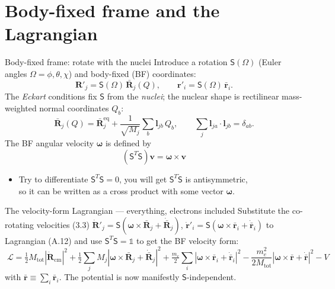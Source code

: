 \documentclass[aspectratio=169,10pt]{beamer}
\newcommand{\stagenum}{0}
\newcommand{\setstage}[1]{\renewcommand{\stagenum}{#1}}
\begin{document}
\setstage{2}
\section{Body-fixed frame and the Lagrangian}

\begin{frame}{Body-fixed frame: rotate with the nuclei}
\setstage{2}
Introduce a rotation $\mathsf S(\Omega)$ (Euler angles $\Omega=\phi,\theta,\chi$) and body-fixed (BF) coordinates:
\begin{equation*}
\mathbf{R}'_j=\mathsf{S}(\Omega)\,\bar{\mathbf{R}}_j(Q),\qquad \mathbf{r}'_i=\mathsf{S}(\Omega)\,\bar{\mathbf{r}}_i. \tag{3.1}
\end{equation*}
The \emph{Eckart} conditions fix $\mathsf S$ from the \emph{nuclei}; the nuclear shape is rectilinear mass-weighted \alert{normal coordinates} $Q_b$:
\begin{equation*}
\bar{\mathbf{R}}_j(Q)=\bar{\mathbf{R}}_j^{\mathrm{eq}}+\frac{1}{\sqrt{M_j}}\sum_b\mathbf{l}_{jb}\,Q_b ,
\qquad \sum_j\mathbf{l}_{ja}\!\cdot\!\mathbf{l}_{jb}=\delta_{ab}. \tag{3.1a}
\end{equation*}
The BF angular velocity $\boldsymbol{\omega}$ is defined by
\begin{equation*}
(\mathsf{S}^{T}\dot{\mathsf{S}}) \mathbf v = \boldsymbol{\omega} \times \mathbf v
\end{equation*}
\begin{itemize}
  \item Try to differentiate $\mathsf{S}^{T}\mathsf{S} = 0$, you will get $\mathsf{S}^{T}\dot{\mathsf{S}}$ is antisymmetric,
  \\ so it can be written as a cross product with some vector $\boldsymbol{\omega}$. 
\end{itemize}
\end{frame}

\begin{frame}{The velocity-form Lagrangian --- everything, electrons included}
\setstage{2}
Substitute the co-rotating velocities (3.3)
$\dot{\mathbf R}'_j=\mathsf S(\boldsymbol\omega\!\times\!\bar{\mathbf R}_j+\dot{\bar{\mathbf R}}_j)$, $\dot{\mathbf r}'_i=\mathsf S(\boldsymbol\omega\!\times\!\bar{\mathbf r}_i+\dot{\bar{\mathbf r}}_i)$ to Lagrangian (A.12) and use $\mathsf S^{T}\mathsf S=\mathbb 1$ to get the BF velocity form:
\begin{equation*}
\boxed{\;\mathcal L=\tfrac12 M_{\mathrm{tot}}|\dot{\mathbf R}_{\mathrm{cm}}|^2
+\tfrac12\sum_j M_j|\boldsymbol\omega\!\times\!\bar{\mathbf R}_j+\dot{\bar{\mathbf R}}_j|^2
+\tfrac{m_e}{2}\sum_i|\boldsymbol\omega\!\times\!\bar{\mathbf r}_i+\dot{\bar{\mathbf r}}_i|^2
-\frac{m_e^2}{2M_{\mathrm{tot}}}|\boldsymbol\omega\!\times\!\bar{\mathbf r}+\dot{\bar{\mathbf r}}|^2-V\;}\tag{3.7$'$}
\end{equation*}
with $\bar{\mathbf r}\equiv\sum_i\bar{\mathbf r}_i$. The potential is now manifestly $\mathsf S$-independent.
\end{frame}
\end{document}
